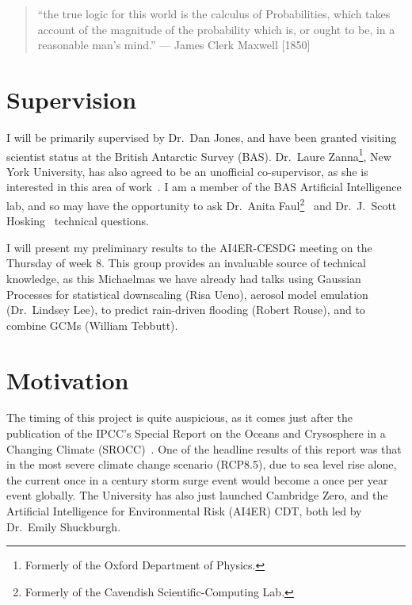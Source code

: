 \documentclass[usenames, dvipsnames, twocolumn]{article}
\begin{document}
\vspace{-20pt}
\begin{quote}
    ``the true logic for this world is the calculus of Probabilities,
     which takes account of the magnitude of the probability which is,
      or ought to be, in a reasonable man’s mind.''
— James Clerk Maxwell [1850]~\cite{williams2006gaussian}
\end{quote}


\section{Supervision}

I will be primarily supervised by Dr.\ Dan Jones,
and have been granted visiting scientist status at the
British Antarctic Survey (BAS).
 Dr.\ Laure Zanna\footnote{Formerly of the Oxford Department of Physics.},
  New York University,
has also agreed to be an unofficial co-supervisor, as
she is interested in this area of work~\cite{ZannaPreprint, wilson2013tide,
 bolton2019applications}.
 I am a member of the BAS Artificial Intelligence lab, and so may
have the opportunity to ask Dr.\ Anita Faul\footnote{Formerly of the Cavendish Scientific-Computing Lab.}~\cite{faul2019concise}
 and Dr.\ J.\ Scott Hosking~\cite{bruinsma2019scalable}
technical questions.

I will present my preliminary results to the AI4ER-CESDG meeting on the Thursday of week 8.
This group provides an invaluable source of technical knowledge, as this Michaelmas we have
already had talks using Gaussian Processes for statistical downscaling
(Risa Ueno), aerosol model emulation (Dr.\ Lindsey Lee),  to predict
rain-driven flooding (Robert Rouse), and to combine GCMs (William Tebbutt).

\section{Motivation}


The timing of this project is quite auspicious, as it comes just after the publication
 of the IPCC's Special Report on the Oceans and Crysosphere in a Changing Climate (SROCC)~\cite{SROCC}.
  One of the headline results of this report was that in the most severe climate change scenario (RCP8.5),
   due to sea level rise alone, the current once in a century storm surge event would become a once per year event globally.
    The University has also just launched Cambridge Zero, and the Artificial Intelligence for Environmental Risk (AI4ER) CDT,
     both led by Dr.\ Emily Shuckburgh.
\end{document}
